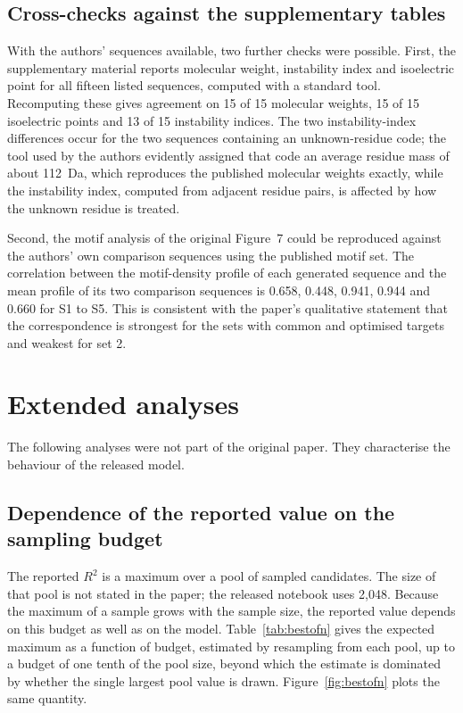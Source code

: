 \documentclass[11pt,a4paper]{article}
\begin{document}
\subsection{Cross-checks against the supplementary tables}

With the authors' sequences available, two further checks were possible. First,
the supplementary material reports molecular weight, instability index and
isoelectric point for all fifteen listed sequences, computed with a standard
tool. Recomputing these gives agreement on 15 of 15 molecular weights, 15 of 15
isoelectric points and 13 of 15 instability indices. The two instability-index
differences occur for the two sequences containing an unknown-residue code; the
tool used by the authors evidently assigned that code an average residue mass of
about 112~Da, which reproduces the published molecular weights exactly, while the
instability index, computed from adjacent residue pairs, is affected by how the
unknown residue is treated.

Second, the motif analysis of the original Figure~7 could be reproduced against
the authors' own comparison sequences using the published motif set. The
correlation between the motif-density profile of each generated sequence and the
mean profile of its two comparison sequences is 0.658, 0.448, 0.941, 0.944 and
0.660 for S1 to S5. This is consistent with the paper's qualitative statement
that the correspondence is strongest for the sets with common and optimised
targets and weakest for set 2.

\section{Extended analyses}

The following analyses were not part of the original paper. They characterise
the behaviour of the released model.

\subsection{Dependence of the reported value on the sampling budget}
\label{sec:bestofn}

The reported $R^2$ is a maximum over a pool of sampled candidates. The size of
that pool is not stated in the paper; the released notebook uses 2{,}048. Because
the maximum of a sample grows with the sample size, the reported value depends on
this budget as well as on the model. Table~\ref{tab:bestofn} gives the expected
maximum as a function of budget, estimated by resampling from each pool, up to a
budget of one tenth of the pool size, beyond which the estimate is dominated by
whether the single largest pool value is drawn. Figure~\ref{fig:bestofn} plots
the same quantity.
\end{document}
